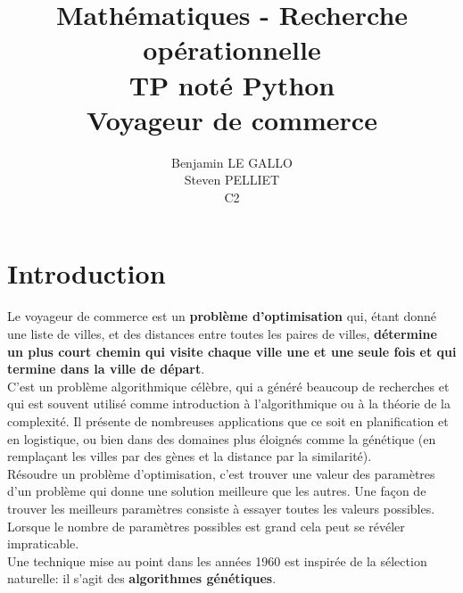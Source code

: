 \documentclass[12pt]{report}
\title{Mathématiques - Recherche opérationnelle \\
TP noté Python \\
\textbf{Voyageur de commerce}}
\author{Benjamin LE GALLO \\
Steven PELLIET \\
C2}
\begin{document}
\maketitle
\thispagestyle{empty}

\tableofcontents

\chapter{Introduction}
 
Le voyageur de commerce est un \textbf{problème d'optimisation} qui, étant donné une liste de villes, 
et des distances entre toutes les paires de villes, \textbf{détermine un plus court chemin qui visite chaque ville 
une et une seule fois et qui termine dans la ville de départ}. \\

C'est un problème algorithmique célèbre, qui a généré beaucoup de recherches et qui est souvent utilisé comme 
introduction à l'algorithmique ou à la théorie de la complexité. Il présente de nombreuses applications que ce soit 
en planification et en logistique, ou bien dans des domaines plus éloignés comme la génétique 
(en remplaçant les villes par des gènes et la distance par la similarité). \\

Résoudre un problème d'optimisation, c'est trouver une valeur des paramètres d'un problème qui donne une solution 
meilleure que les autres. Une façon de trouver les meilleurs paramètres consiste à essayer toutes les valeurs possibles.
Lorsque le nombre de paramètres possibles est grand cela peut se révéler impraticable.\\

Une technique mise au point dans les années 1960 est inspirée de la sélection naturelle: il s'agit 
des \textbf{algorithmes génétiques}. \\
\end{document}
